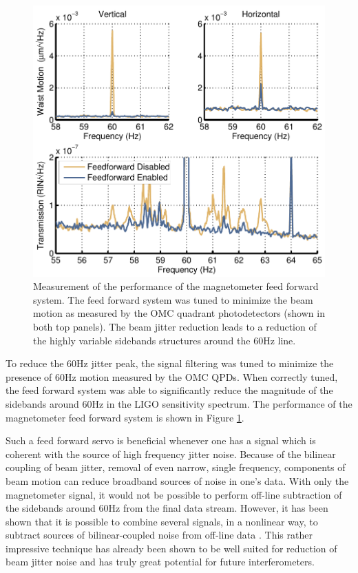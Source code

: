 \begin{figure}
  \begin{center}
  \leavevmode
  \includegraphics{figs-jitter/magffperformance.pdf}
  \end{center}
  \caption[Measurement of the performance of the magnetometer feed forward system.]{Measurement of the performance of the magnetometer feed forward system. The feed forward system was tuned to minimize the beam motion as measured by the OMC quadrant photodetectors (shown in both top panels). The beam jitter reduction leads to a reduction of the highly variable sidebands structures around the 60Hz line.}
  \label{fig:magffperformance}
\end{figure}

To reduce the 60Hz jitter peak, the signal filtering was tuned to minimize the presence of 60Hz motion measured by the OMC QPDs. %
When correctly tuned, the feed forward system was able to significantly reduce the magnitude of the sidebands around 60Hz in the LIGO sensitivity spectrum. %
The performance of the magnetometer feed forward system is shown in Figure \ref{fig:magffperformance}.

Such a feed forward servo is beneficial whenever one has a signal which is coherent with the source of high frequency jitter noise. %
Because of the bilinear coupling of beam jitter, removal of even narrow, single frequency, components of beam motion can reduce broadband sources of noise in one's data. %
With only the magnetometer signal, it would not be possible to perform off-line subtraction of the sidebands around 60Hz from the final data stream. %
However, it has been shown that it is possible to combine several signals, in a nonlinear way, to subtract sources of bilinear-coupled noise from off-line data \cite{G1200197,G1200288}. %
This rather impressive technique has already been shown to be well suited for reduction of beam jitter noise and has truly great potential for future interferometers.

